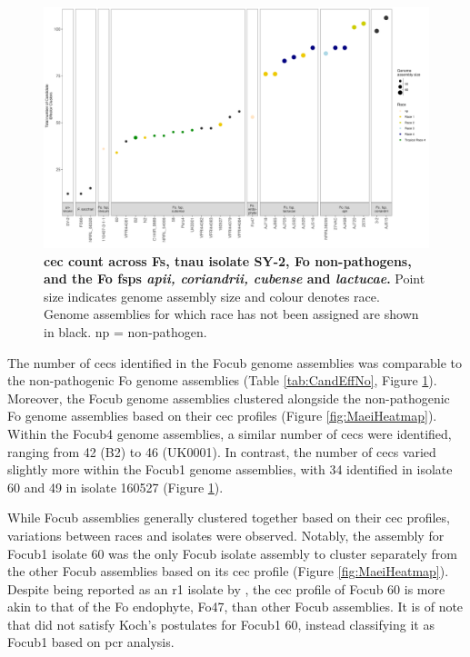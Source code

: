 \begin{figure}
    \centering
    \includegraphics[width=22cm]{Figures/CecDistribinFspOfInterest.png}
    \captionsetup{width=20cm}
    \caption[\Acl{cec} count across \acl{Fs}, \ac{tnau} isolate SY-2, \acl{Fo} non-pathogens, and the \ac{Fo} \acp{fsp} \textit{apii, coriandrii, cubense} and \textit{lactucae}.]{\textbf{\Acf{cec} count across \acl{Fs}, \ac{tnau} isolate SY-2, \acf{Fo} non-pathogens, and the \ac{Fo} \acp{fsp} \textit{apii, coriandrii, cubense} and \textit{lactucae}.} Point size indicates genome assembly size and colour denotes race. Genome assemblies for which race has not been assigned are shown in black. np = non-pathogen.}
    \label{fig:CECcount}
\end{figure}

The number of \acp{cec} identified in the \ac{Focub} genome assemblies was comparable to the non-pathogenic \ac{Fo} genome assemblies (Table \ref{tab:CandEffNo}, Figure \ref{fig:CECcount}). Moreover, the \ac{Focub} genome assemblies clustered alongside the non-pathogenic \ac{Fo} genome assemblies based on their \ac{cec} profiles (Figure \ref{fig:MaeiHeatmap}). Within the \ac{Focub4} genome assemblies, a similar number of \acp{cec} were identified, ranging from 42 (B2) to 46 (UK0001). In contrast, the number of \acp{cec} varied slightly more within the \ac{Focub1} genome assemblies, with 34 identified in isolate 60 and 49 in isolate 160527 (Figure \ref{fig:CECcount}).

While \ac{Focub} assemblies generally clustered together based on their \ac{cec} profiles, variations between races and isolates were observed. Notably, the assembly for \ac{Focub1} isolate 60 was the only \ac{Focub} isolate assembly to cluster separately from the other \ac{Focub} assemblies based on its \ac{cec} profile (Figure \ref{fig:MaeiHeatmap}). Despite being reported as an \ac{r1} isolate by \textcite{Yun2019}, the \ac{cec} profile of \ac{Focub} 60 is more akin to that of the \ac{Fo} endophyte, Fo47, than other \ac{Focub} assemblies. It is of note that \textcite{Yun2019} did not satisfy Koch's postulates for \ac{Focub1} 60, instead classifying it as \ac{Focub1} based on \ac{pcr} analysis.

